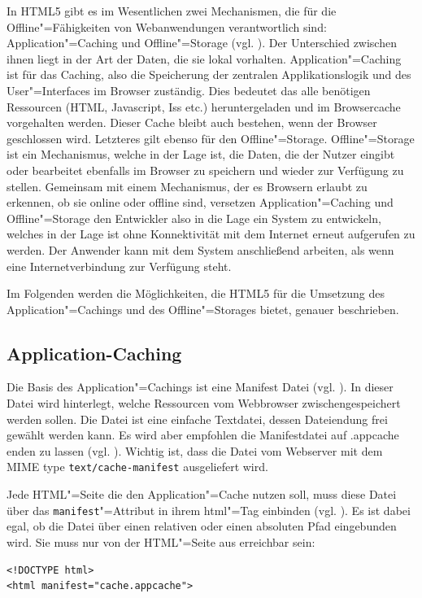 In \ac{HTML}5 gibt es im Wesentlichen zwei Mechanismen, die für die Offline"=Fähigkeiten von Webanwendungen verantwortlich sind: Application"=Caching und Offline"=Storage (vgl. \cite{Mahemoff22010}). Der Unterschied zwischen ihnen liegt in der Art der Daten, die sie lokal vorhalten. Application"=Caching ist für das Caching, also die Speicherung der zentralen Applikationslogik und des User"=Interfaces im Browser zuständig. Dies bedeutet das alle benötigen Ressourcen (\ac{HTML}, Javascript, Iss etc.) heruntergeladen und im Browsercache vorgehalten werden. Dieser Cache bleibt auch bestehen, wenn der Browser geschlossen wird. Letzteres gilt ebenso für den Offline"=Storage. Offline"=Storage ist ein Mechanismus, welche in der Lage ist, die Daten, die der Nutzer eingibt oder bearbeitet ebenfalls im Browser zu speichern und wieder zur Verfügung zu stellen. Gemeinsam mit einem Mechanismus, der es Browsern erlaubt zu erkennen, ob sie online oder offline sind, versetzen Application"=Caching und Offline"=Storage den Entwickler also in die Lage ein System zu entwickeln, welches in der Lage ist ohne Konnektivität mit dem Internet erneut aufgerufen zu werden. Der Anwender kann mit dem System anschließend arbeiten, als wenn eine Internetverbindung zur Verfügung steht.

Im Folgenden werden die Möglichkeiten, die \ac{HTML}5 für die Umsetzung des Application"=Cachings und des Offline"=Storages bietet, genauer beschrieben.

\subsection{Application-Caching}\label{section:appcache}
Die Basis des Application"=Cachings ist eine Manifest Datei (vgl. \cite{Bidelman2010}). In dieser Datei wird hinterlegt, welche Ressourcen vom Webbrowser zwischengespeichert werden sollen. Die Datei ist eine einfache Textdatei, dessen Dateiendung frei gewählt werden kann. Es wird aber empfohlen die Manifestdatei auf .appcache enden zu lassen (vgl. \cite{W3C2012}). Wichtig ist, dass die Datei vom Webserver mit dem MIME type \texttt{text/cache-manifest} ausgeliefert wird.

Jede \ac{HTML}"=Seite die den Application"=Cache nutzen soll, muss diese Datei über das \texttt{ma\allowbreak ni\allowbreak fest}"=Attribut in ihrem html"=Tag einbinden (vgl. \cite{html5upandrunningchapter8}). Es ist dabei egal, ob die Datei über einen relativen oder einen absoluten Pfad eingebunden wird. Sie muss nur von der \ac{HTML}"=Seite aus erreichbar sein:
\begin{lstlisting}
<!DOCTYPE html>
<html manifest="cache.appcache">
\end{lstlisting}

